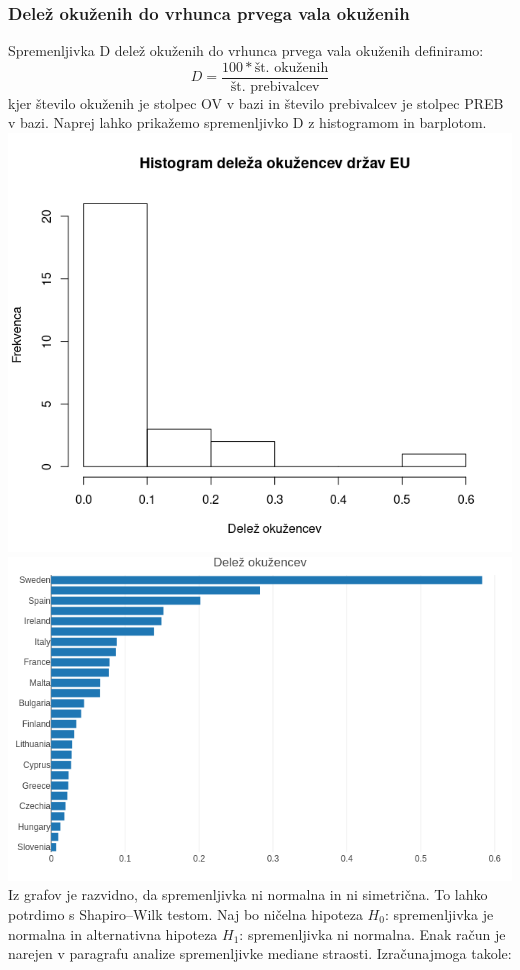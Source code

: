 \documentclass[a4paper,11pt]{article}
\begin{document}
\subsubsection{Delež okuženih do vrhunca prvega vala okuženih}
Spremenljivka D delež okuženih do vrhunca prvega vala okuženih definiramo:
\[D = \frac{100 * \text{št. okuženih}}{\text{št. prebivalcev}}\]
kjer število okuženih je stolpec OV v bazi in število prebivalcev je stolpec PREB v bazi. Naprej lahko prikažemo spremenljivko D z histogramom in barplotom.
\includegraphics[scale=0.6]{histogram_delez_okuzenih}
\includegraphics[scale=0.6]{barplot_delez_okuzenih}
Iz grafov je razvidno, da spremenljivka ni normalna in ni simetrična. To lahko potrdimo s Shapiro–Wilk testom. Naj bo ničelna hipoteza \(H_0\): spremenljivka je normalna in alternativna hipoteza \(H_1\): spremenljivka ni normalna. Enak račun je narejen v paragrafu analize spremenljivke mediane straosti. Izračunajmoga takole:
\end{document}
